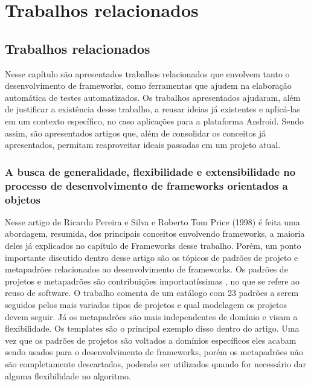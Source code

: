 \documentclass[
    12pt,       %
    openright,      %
    twoside,      %
    a4paper,      %
    english,      %
    french,       %
    spanish,      %
    brazil,       %
    ]{abntex2}
\begin{document}
  \part{Trabalhos relacionados}

  \chapter{Trabalhos relacionados}
    Nesse capítulo são apresentados trabalhos relacionados que envolvem tanto o desenvolvimento de frameworks,
    como ferramentas que ajudem na elaboração automática de testes automatizados. Os trabalhos apresentados
    ajudaram, além de justificar a existência desse trabalho, a reusar ideias já existentes e aplicá-las em um
    contexto específico, no caso aplicações para a plataforma Android. Sendo assim, são apresentados artigos
    que, além de consolidar os conceitos já apresentados, permitam reaproveitar ideais passadas em um projeto atual.

    \section{A busca de generalidade, flexibilidade e extensibilidade no processo de desenvolvimento de frameworks orientados a objetos}
      Nesse artigo de Ricardo Pereira e Silva e Roberto Tom Price (1998) é feita uma abordagem, resumida, dos principais conceitos envolvendo frameworks, a
      maioria deles já explicados no capítulo de Frameworks desse trabalho. Porém, um ponto importante
      discutido dentro desse artigo são os tópicos de padrões de projeto e metapadrões relacionados
      ao desenvolvimento de frameworks. Os padrões de projetos e metapadrões são contribuições
      importantíssimas , no que se refere ao reuso de software. O trabalho comenta de um catálogo com
      23 padrões a serem seguidos pelos mais variados tipos de projetos e qual modelagem os projetos devem
      seguir. Já os metapadrões são mais independentes de domínio e visam a flexibilidade. Os templates são o
      principal exemplo disso dentro do artigo. Uma vez que os padrões de projetos são voltados a domínios
      específicos eles acabam sendo usados para o desenvolvimento de frameworks, porém os metapadrões não são
      completamente descartados, podendo ser utilizados quando for necessário dar alguma flexibilidade no
      algoritmo.
\end{document}
